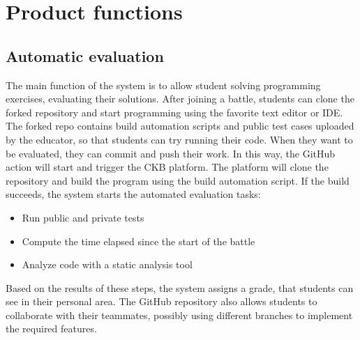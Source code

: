 \section{Product functions}
\subsection{Automatic evaluation}
The main function of the system is to allow student solving programming exercises, evaluating their solutions.
After joining a battle, students can clone the forked repository and start programming using the favorite text editor or IDE.
The forked repo contains build automation scripts and public test cases uploaded by the educator, so that students can try running their code.
When they want to be evaluated, they can commit and push their work. In this way, the GitHub action will start and trigger the CKB platform.
The platform will clone the repository and build the program using the build automation script.
If the build succeeds, the system starts the automated evaluation tasks:
\begin{itemize}
	\item Run public and private tests
	\item Compute the time elapsed since the start of the battle
	\item Analyze code with a static analysis tool
\end{itemize}
Based on the results of these steps, the system assigns a grade, that students can see in their personal area.
The GitHub repository also allows students to collaborate with their teammates, possibly using different branches to implement the required features.
\begin{adjustbox}{
		max size={\textwidth}{},
		caption={Automatic evaluation activity diagram},
		label={fig:Automatic evaluation activity diagram},
		figure=H}
	\centering
\end{adjustbox}

\pagebreak

